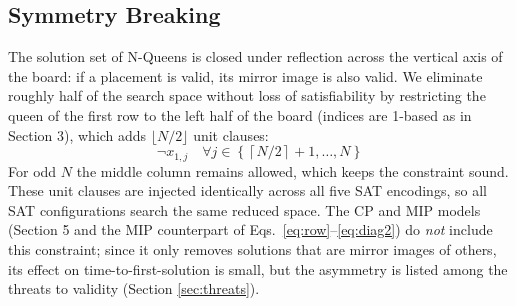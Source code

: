 \documentclass[a4paper,fleqn]{cas-sc}
\begin{document}
\subsection{Symmetry Breaking}
The solution set of N-Queens is closed under reflection across the vertical axis of the board: if a placement is valid, its mirror image is also valid. We eliminate roughly half of the search space without loss of satisfiability by restricting the queen of the first row to the left half of the board (indices are 1-based as in Section 3), which adds $\lfloor N/2 \rfloor$ unit clauses:
\begin{equation}
    \neg x_{1,j} \quad \forall j \in \left\{\left\lceil N/2 \right\rceil + 1, \dots, N\right\}
\end{equation}
For odd $N$ the middle column remains allowed, which keeps the constraint sound. These unit clauses are injected identically across all five SAT encodings, so all SAT configurations search the same reduced space. The CP and MIP models (Section 5 and the MIP counterpart of Eqs.~\eqref{eq:row}--\eqref{eq:diag2}) do \emph{not} include this constraint; since it only removes solutions that are mirror images of others, its effect on time-to-first-solution is small, but the asymmetry is listed among the threats to validity (Section \ref{sec:threats}).
\end{document}
